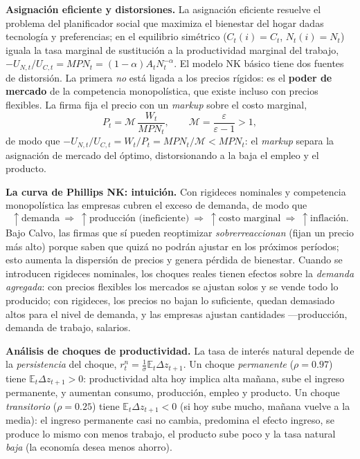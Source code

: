 \documentclass[11pt]{article}
\theoremstyle{definition}
\newcommand{\E}{\mathbb{E}}
\begin{document}
\textbf{Asignación eficiente y distorsiones.} La asignación eficiente resuelve el problema del
planificador social que maximiza el bienestar del hogar dadas tecnología y preferencias; en el
equilibrio simétrico ($C_{t}(i)=C_{t}$, $N_{t}(i)=N_{t}$) iguala la tasa marginal de sustitución a la
productividad marginal del trabajo, $-U_{N,t}/U_{C,t}=MPN_{t}=(1-\alpha)A_{t}N_{t}^{-\alpha}$. El modelo
NK básico tiene dos fuentes de distorsión. La primera \emph{no} está ligada a los precios rígidos: es
el \textbf{poder de mercado} de la competencia monopolística, que existe incluso con precios flexibles.
La firma fija el precio con un \emph{markup} sobre el costo marginal,
\begin{equation}
P_{t}=\mathcal{M}\,\frac{W_{t}}{MPN_{t}},\qquad \mathcal{M}=\frac{\varepsilon}{\varepsilon-1}>1,
\end{equation}
de modo que $-U_{N,t}/U_{C,t}=W_{t}/P_{t}=MPN_{t}/\mathcal{M}<MPN_{t}$: el \emph{markup} separa la
asignación de mercado del óptimo, distorsionando a la baja el empleo y el producto.

\textbf{La curva de Phillips NK: intuición.} Con rigideces nominales y competencia monopolística las
empresas cubren el exceso de demanda, de modo que
\[
\uparrow\text{demanda}\ \Rightarrow\ \uparrow\text{producción (ineficiente)}\ \Rightarrow\ \uparrow\text{costo marginal}\ \Rightarrow\ \uparrow\text{inflación.}
\]
Bajo Calvo, las firmas que sí pueden reoptimizar \emph{sobrerreaccionan} (fijan un precio más alto)
porque saben que quizá no podrán ajustar en los próximos períodos; esto aumenta la dispersión de
precios y genera pérdida de bienestar. Cuando se introducen rigideces nominales, los choques reales
tienen efectos sobre la \emph{demanda agregada}: con precios flexibles los mercados se ajustan solos y
se vende todo lo producido; con rigideces, los precios no bajan lo suficiente, quedan demasiado altos
para el nivel de demanda, y las empresas ajustan cantidades ---producción, demanda de trabajo,
salarios.

\textbf{Análisis de choques de productividad.} La tasa de interés natural depende de la
\emph{persistencia} del choque, $r_{t}^{n}=\tfrac{1}{\sigma}\E_{t}\Delta z_{t+1}$. Un choque
\emph{permanente} ($\rho=0.97$) tiene $\E_{t}\Delta z_{t+1}>0$: productividad alta hoy implica alta
mañana, sube el ingreso permanente, y aumentan consumo, producción, empleo y producto. Un choque
\emph{transitorio} ($\rho=0.25$) tiene $\E_{t}\Delta z_{t+1}<0$ (si hoy sube mucho, mañana vuelve a la
media): el ingreso permanente casi no cambia, predomina el efecto ingreso, se produce lo mismo con
menos trabajo, el producto sube poco y la tasa natural \emph{baja} (la economía desea menos ahorro).
\end{document}
